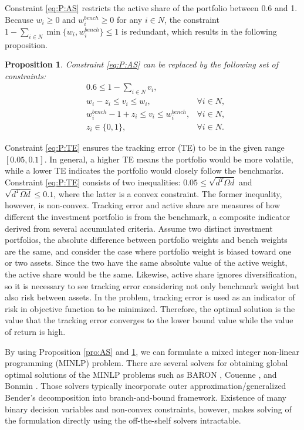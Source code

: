 \documentclass[11pt]{article}
\newtheorem{pro}{Proposition}
\begin{document}
	Constraint \eqref{eq:P:AS} restricts the active share of the portfolio between 0.6 and 1. Because $w_i \ge 0$ and $w^{bench}_i \ge 0$ for any $i \in N$, the constraint $1 - \sum_{i \in N} \min\{w_i, w^{bench}_i \} \le 1$ is redundant, which results in the following proposition.
	\begin{pro}\label{pro:TE}
		Constraint \eqref{eq:P:AS} can be replaced by the following set of constraints:
		\begin{align*}
		& 0.6 \le 1 -  \sum_{i \in N} v_i,\\
		& w_i - z_i \le v_i \le w_i, & \forall i \in N,\\
		& w^{bench}_i - 1 + z_i \le v_i \le w^{bench}_i, & \forall i \in N,\\
		& z_i \in \{0,1\}, & \forall i \in N.
		\end{align*}
	\end{pro}
	
	Constraint \eqref{eq:P:TE} ensures the tracking error (TE) to be in the given range $[0.05,0.1]$. In general, a higher TE means the portfolio would be more volatile, while a lower TE indicates the portfolio would closely follow the benchmarks. Constraint \eqref{eq:P:TE} consists of two inequalities: $0.05 \le \sqrt{d^T \Omega d}$ and $\sqrt{d^T \Omega d} \le 0.1$, where the latter is a convex constraint. The former inequality, however, is non-convex. Tracking error and active share are measures of how different the investment portfolio is from the benchmark, a composite indicator derived from several accumulated criteria. Assume two distinct investment portfolios, the absolute difference between portfolio weights and bench weights are the same, and consider the case where portfolio weight is biased toward one or two assets. Since the two have the same absolute value of the active weight, the active share would be the same. Likewise, active share ignores diversification, so it is necessary to see tracking error considering not only benchmark weight but also risk between assets. In the problem, tracking error is used as an indicator of risk in objective function to be minimized. Therefore, the optimal solution is the value that the tracking error converges to the lower bound value while the value of return is high.
   	
	By using Proposition \ref{pro:AS} and \ref{pro:TE}, we can formulate a mixed integer non-linear programming (MINLP) problem. There are several solvers for obtaining global optimal solutions of the MINLP problems such as BARON \citep{sahinidis:baron:17.8.9}, Couenne \citep{coin}, and Bonmin \citep{BONAMI2008186}. Those solvers typically incorporate outer approximation/generalized Bender's decomposition into branch-and-bound framework. Existence of many binary decision variables and non-convex constraints, however, makes solving of the formulation directly using the off-the-shelf solvers intractable. 
	
\end{document}

